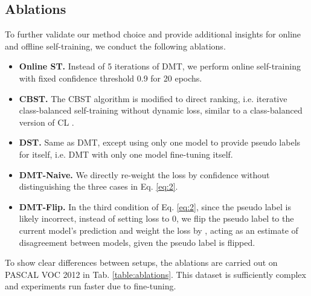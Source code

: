 \documentclass[preprint,review,10pt]{elsarticle}
\begin{document}
\subsection{Ablations}
\label{sec:54}

To further validate our method choice and provide additional insights for online and offline self-training, we conduct the following ablations.

\begin{itemize}
    \item \textbf{Online ST.} Instead of 5 iterations of DMT, we perform online self-training with fixed confidence threshold 0.9 for 20 epochs.
    \item \textbf{CBST.} The CBST algorithm \cite{cbst} is modified to direct ranking, i.e. iterative class-balanced self-training without dynamic loss, similar to a class-balanced version of CL \cite{cascante2020curriculum}.
    \item \textbf{DST.} Same as DMT, except using only one model to provide pseudo labels for itself, i.e. DMT with only one model  fine-tuning itself.
    \item \textbf{DMT-Naive.} We directly re-weight the loss by confidence without distinguishing the three cases in Eq. \ref{eq:2}.
    \item \textbf{DMT-Flip.} In the third condition of Eq. \ref{eq:2}, since the pseudo label is likely incorrect, instead of setting loss to 0, we flip the pseudo label to the current model's prediction and weight the loss by , acting as an estimate of disagreement between models, given the pseudo label is flipped.
\end{itemize}

\begin{table}[t]
\caption{Ablations on PASCAL VOC 2012 (one random 1/20 split and one random 1/50 split). \textit{val} mean IoU () is reported. }
\label{table:ablations}
\centering
{}
\end{table}

To show clear differences between setups, the ablations are carried out on PASCAL VOC 2012 in Tab. \ref{table:ablations}. This dataset is sufficiently complex and experiments run faster due to fine-tuning.
\end{document}
